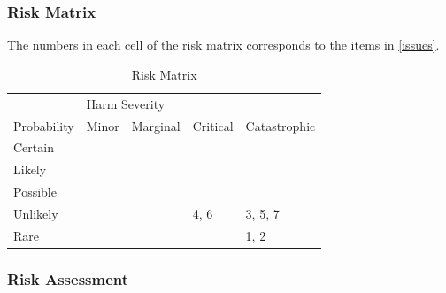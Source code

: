 \documentclass[12pt]{article}
\begin{document}
\subsubsection{Risk Matrix}

The numbers in each cell of the risk matrix corresponds to the items in \ref{issues}.

\begin{table}[H]
\centering
\begin{tabular}{l|llll}
                              & \multicolumn{4}{l}{Harm Severity}                                                                                                                                                             \\
\multirow{-2}{*}{Probability} & \multicolumn{1}{l|}{Minor}                    & \multicolumn{1}{l|}{Marginal}                 & \multicolumn{1}{l|}{Critical}                 & \multicolumn{1}{l|}{Catastrophic}             \\ \hline
Certain                       & \multicolumn{1}{l|}{\cellcolor[HTML]{FE996B}} & \multicolumn{1}{l|}{\cellcolor[HTML]{FE996B}} & \multicolumn{1}{l|}{\cellcolor[HTML]{FD6864}} & \multicolumn{1}{l|}{\cellcolor[HTML]{FD6864}} \\ \hline
Likely                        & \multicolumn{1}{l|}{\cellcolor[HTML]{FFFE65}} & \multicolumn{1}{l|}{\cellcolor[HTML]{FE996B}} & \multicolumn{1}{l|}{\cellcolor[HTML]{FE996B}} & \multicolumn{1}{l|}{\cellcolor[HTML]{FD6864}} \\ \hline
Possible                      & \multicolumn{1}{l|}{\cellcolor[HTML]{67FD9A}} & \multicolumn{1}{l|}{\cellcolor[HTML]{FFFE65}} & \multicolumn{1}{l|}{\cellcolor[HTML]{FE996B}} & \multicolumn{1}{l|}{\cellcolor[HTML]{FD6864}} \\ \hline
Unlikely                      & \multicolumn{1}{l|}{\cellcolor[HTML]{67FD9A}} & \multicolumn{1}{l|}{\cellcolor[HTML]{FFFE65}} & \multicolumn{1}{l|}{4, 6\cellcolor[HTML]{FFFE65}} & \multicolumn{1}{l|}{3, 5, 7\cellcolor[HTML]{FE996B}} \\ \hline
Rare                          & \multicolumn{1}{l|}{\cellcolor[HTML]{67FD9A}} & \multicolumn{1}{l|}{\cellcolor[HTML]{67FD9A}} & \multicolumn{1}{l|}{\cellcolor[HTML]{FFFE65}} & \multicolumn{1}{l|}{1, 2\cellcolor[HTML]{FFFE65}} \\ \hline
\end{tabular}
\caption{Risk Matrix}
\label{tab:risk-matrix}
\end{table}


\subsubsection{Risk Assessment}
\end{document}
